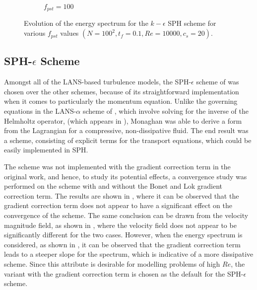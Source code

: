 \begin{figure}[htbp!]
\begin{subfigure}{7cm}
    \caption{$f_{pst} = 100$}
  \end{subfigure}
  \caption{Evolution of the energy spectrum for the $k-\epsilon$ SPH scheme for various $f_{pst}$ values $(N=100^2, t_f=0.1, Re=10000, c_s=20)$.}
  \label{fig:keps-pst-espec}
\end{figure}



\subsection[SPH-epsilon Scheme]{SPH-$\epsilon$ Scheme}
Amongst all of the LANS-based turbulence models, the SPH-$\epsilon$ scheme of \cite{Monaghan2017} was chosen over the other schemes, because of its straightforward implementation when it comes to particularly the momentum equation. Unlike the governing equations in the LANS-$\alpha$ scheme of \cite{Mohseni2003}, which involve solving for the inverse of the Helmholtz operator, (which appears in ), Monaghan was able to derive a form from the Lagrangian for a compressive, non-dissipative fluid. The end result was a scheme, consisting of explicit terms for the transport equations, which could be easily implemented in SPH.

The scheme was not implemented with the gradient correction term in the original work, and hence, to study its potential effects, a convergence study was performed on the scheme with and without the Bonet and Lok gradient correction term.
The results are shown in , where it can be observed that the gradient correction term does not appear to have a significant effect on the convergence of the scheme.
The same conclusion can be drawn from the velocity magnitude field, as shown in , where the velocity field does not appear to be significantly different for the two cases.
However, when the energy spectrum is considered, as shown in , it can be observed that the gradient correction term leads to a steeper slope for the spectrum, which is indicative of a more dissipative scheme. Since this attribute is desirable for modelling problems of high $Re$, the variant with the gradient correction term is chosen as the default for the SPH-$\epsilon$ scheme.

